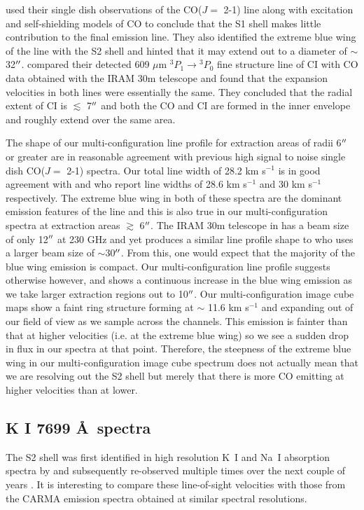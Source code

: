 \documentclass[preprint2]{aastex}
\begin{document}
\cite{1987ApJ...313..400H} used their single dish observations of the CO($J=$ 2-1) line along with excitation and self-shielding models of CO to conclude that the S1 shell makes little contribution to the final emission line. They also identified the extreme blue wing of the line with the S2 shell and hinted that it may extend out to a diameter of $\sim$ 32$\mbox{$^{\prime\prime}$}$. \cite{1994ApJ...424L.127H} compared their detected 609 $\mu$m ${}^3P{}_1\rightarrow{}^3P{}_0$ fine structure line of CI with CO data obtained with the IRAM 30m telescope and found that the expansion velocities in both lines were essentially the same. They concluded that the radial extent of CI is $\lesssim$ 7$\mbox{$^{\prime\prime}$}$ and both the CO and CI are formed in the inner envelope and roughly extend over the same area. 

The shape of our multi-configuration line profile for extraction areas of radii 6$\mbox{$^{\prime\prime}$}$ or greater are in reasonable agreement with previous high signal to noise single dish CO($J=$ 2-1) spectra. Our total line width of 28.2 km s${}^{-1}$ is in good agreement with \cite{1987ApJ...313..400H} and \cite{1994ApJ...424L.127H} who report line widths of 28.6 km s${}^{-1}$ and 30 km s${}^{-1}$ respectively. The extreme blue wing in both of these spectra are the dominant emission features of the line and this is also true in our multi-configuration spectra at extraction areas $\gtrsim$ 6$\mbox{$^{\prime\prime}$}$. The IRAM 30m telescope in \cite{1994ApJ...424L.127H} has a beam size of only 12$\mbox{$^{\prime\prime}$}$ at 230 GHz and yet produces a similar line profile shape to \cite{1987ApJ...313..400H} who uses a larger beam size of $\sim$30$\mbox{$^{\prime\prime}$}$. From this, one would expect that the majority of the blue wing emission is compact. Our multi-configuration line profile suggests otherwise however, and shows a continuous increase in the blue wing emission as we take larger extraction regions out to 10$\mbox{$^{\prime\prime}$}$. Our multi-configuration image cube maps show a faint ring structure forming at $\sim$ 11.6 km s${}^{-1}$ and expanding out of our field of view as we sample across the channels. This emission is fainter than that at higher velocities (i.e. at the extreme blue wing) so we see a sudden drop in flux in our spectra at that point. Therefore, the steepness of the extreme blue wing in our multi-configuration image cube spectrum does not actually mean that we are resolving out the S2 shell but merely that there is more CO emitting at higher velocities than at lower.

\subsection{K I 7699 \AA \ spectra}
The S2 shell was first identified in high resolution K~I and Na~I absorption spectra by \cite{1975ApJ...199..427G} and subsequently re-observed multiple times over the next couple of years \citep{1979QJRAS..20..361G}. It is interesting to compare these line-of-sight velocities with those from the CARMA emission spectra obtained at similar spectral resolutions.
\end{document}
